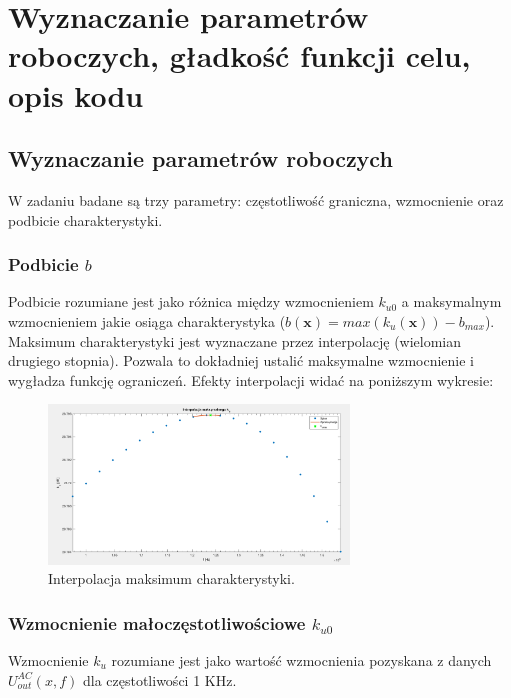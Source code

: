 \documentclass{article}
\begin{document}
\section{Wyznaczanie parametrów roboczych, gładkość funkcji celu, opis kodu}
\subsection{Wyznaczanie parametrów roboczych}
W zadaniu badane są trzy parametry: częstotliwość graniczna, wzmocnienie oraz podbicie charakterystyki.

\subsubsection*{Podbicie $b$}
Podbicie rozumiane jest jako różnica między wzmocnieniem $k_{u0}$ a maksymalnym wzmocnieniem jakie osiąga charakterystyka ($b(\textbf{x})=max(k_{u}(\textbf{x}))-b_{max}$).
Maksimum charakterystyki jest wyznaczane przez interpolację (wielomian drugiego stopnia). Pozwala to dokładniej ustalić maksymalne wzmocnienie i wygładza funkcję ograniczeń.
Efekty interpolacji widać na poniższym wykresie:
\begin{figure}[h]
    \includegraphics[width=8cm]{graphics/max_ku_interp.png}
    \centering
    \caption{Interpolacja maksimum charakterystyki.}
\end{figure}
\pagebreak
\subsubsection*{Wzmocnienie małoczęstotliwościowe $k_{u0}$}
Wzmocnienie $k_u$ rozumiane jest jako wartość wzmocnienia pozyskana z danych $U^{AC}_{out}(x,f)$ dla częstotliwości 1 KHz.
\end{document}
